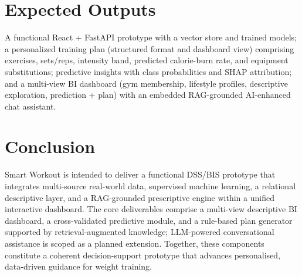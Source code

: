 \documentclass[11pt,a4paper]{article}
\begin{document}
\section{Expected Outputs}
A functional React + FastAPI prototype with a vector store and trained models; a personalized training plan (structured format and dashboard view) comprising exercises, sets/reps, intensity band, predicted calorie-burn rate, and equipment substitutions; predictive insights with class probabilities and SHAP attribution; and a multi-view BI dashboard (gym membership, lifestyle profiles, descriptive exploration, prediction + plan) with an embedded RAG-grounded AI-enhanced chat assistant.

\section{Conclusion}
Smart Workout is intended to deliver a functional DSS/BIS prototype that integrates multi-source real-world data, supervised machine learning, a relational descriptive layer, and a RAG-grounded prescriptive engine within a unified interactive dashboard. The core deliverables comprise a multi-view descriptive BI dashboard, a cross-validated predictive module, and a rule-based plan generator supported by retrieval-augmented knowledge; LLM-powered conversational assistance is scoped as a planned extension. Together, these components constitute a coherent decision-support prototype that advances personalised, data-driven guidance for weight training.

\end{document}
